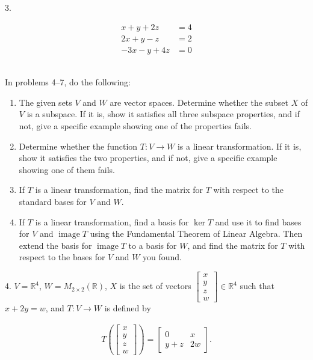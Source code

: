 \documentclass{article}
\begin{document}
3.

\begin{align*}
	x + y + 2z &= 4\\
	2x + y - z &= 2\\
	-3x - y + 4z &= 0
\end{align*}

~\\

In problems 4--7, do the following:

\begin{enumerate}

	\item The given sets $V$ and $W$ are vector spaces. Determine whether the subset $X$ of $V$ is a subspace. If it is, show it satisfies all three subspace properties, and if not, give a specific example showing one of the properties fails.

	\item Determine whether the function $T : V \to W$ is a linear transformation. If it is, show it satisfies the two properties, and if not, give a specific example showing one of them fails.

	\item If $T$ is a linear transformation, find the matrix for $T$ with respect to the standard bases for $V$ and $W$.

	\item If $T$ is a linear transformation, find a basis for $\ker T$ and use it to find bases for $V$ and $\operatorname{image} T$ using the Fundamental Theorem of Linear Algebra. Then extend the basis for $\operatorname{image} T$ to a basis for $W$, and find the matrix for $T$ with respect to the bases for $V$ and $W$ you found.

\end{enumerate}

4. $V = \mathbb{R}^4$, $W = M_{2 \times 2}(\mathbb{R})$, $X$ is the set of vectors $\left[\begin{array}{c} x \\ y \\ z \\ w \end{array}\right] \in \mathbb{R}^4$ such that $x + 2y = w$, and $T : V \to W$ is defined by

\begin{align*}
	T\left( \left[\begin{array}{c} x \\ y \\ z \\ w \end{array}\right] \right) = \left[\begin{array}{cc} 0& x \\ y + z& 2w \end{array}\right].
\end{align*}
\end{document}
